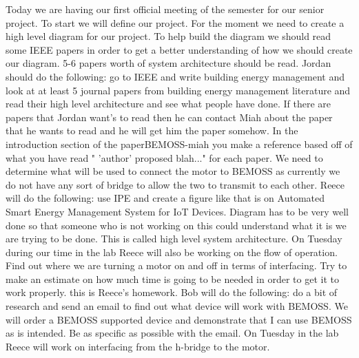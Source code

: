 \documentclass[fontsize=11pt, %
                             paper=letter, %
                             twoside, %
                             captions=tableheading,
                             index=totoc,
                             hyperref]{labbook}
\begin{document}
Today we are having our first official meeting of the semester for our senior project. To start we will define our project. For the moment we need to create a high level diagram for our project. To help build the diagram we should read some IEEE papers in order to get a better understanding of how we should create our diagram. 5-6 papers worth of system architecture should be read. Jordan should do the following: go to IEEE and write building energy management and look at at least 5 journal papers from building energy management literature and read their high level architecture and see what people have done. If there are papers that Jordan want's to read then he can contact Miah about the paper that he wants to read and he will get him the paper somehow. In the introduction section of the paperBEMOSS-miah you make a reference based off of what you have read " 'author' proposed blah..." for each paper. We need to determine what will be used to connect the motor to BEMOSS as currently we do not have any sort of bridge to allow the two to transmit to each other. Reece will do the following: use IPE and create a figure like that is on Automated Smart Energy Management System for IoT Devices. Diagram has to be very well done so that someone who is not working on this could understand what it is we are trying to be done. This is called high level system architecture. On Tuesday during our time in the lab Reece will also be working on the flow of operation. Find out where we are turning a motor on and off in terms of interfacing. Try to make an estimate on how much time is going to be needed in order to get it to work properly. this is Reece's homework. Bob will do the following: do a bit of research and send an email to find out what device will work with BEMOSS. We will order a BEMOSS supported device and demonstrate that I can use BEMOSS as is intended. Be as specific as possible with the email. On Tuesday in the lab Reece will work on interfacing from the h-bridge to the motor.  
\end{document}
